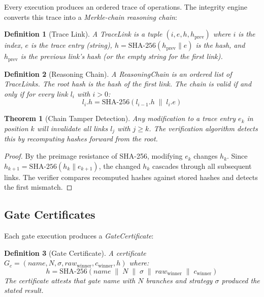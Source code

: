 \documentclass[11pt,a4paper]{article}
\newtheorem{definition}{Definition}[section]
\newtheorem{theorem}{Theorem}[section]
\begin{document}
Every execution produces an ordered trace of operations. The integrity engine
converts this trace into a \emph{Merkle-chain reasoning chain}:

\begin{definition}[Trace Link]
A \emph{TraceLink} is a tuple $(i, e, h, h_{\text{prev}})$ where $i$ is the
index, $e$ is the trace entry (string), $h = \mathrm{SHA\text{-}256}(h_{\text{prev}} \| e)$
is the hash, and $h_{\text{prev}}$ is the previous link's hash (or the empty
string for the first link).
\end{definition}

\begin{definition}[Reasoning Chain]
A \emph{ReasoningChain} is an ordered list of TraceLinks. The
\emph{root hash} is the hash of the first link. The chain is
\emph{valid} if and only if for every link $l_i$ with $i > 0$:
\[
  l_i.h = \mathrm{SHA\text{-}256}(l_{i-1}.h \;\|\; l_i.e)
\]
\end{definition}

\begin{theorem}[Chain Tamper Detection]
Any modification to a trace entry $e_k$ in position $k$ will invalidate
all links $l_j$ with $j \geq k$. The verification algorithm detects this
by recomputing hashes forward from the root.
\end{theorem}

\begin{proof}
By the preimage resistance of SHA-256, modifying $e_k$ changes $h_k$.
Since $h_{k+1} = \mathrm{SHA\text{-}256}(h_k \| e_{k+1})$, the changed $h_k$
cascades through all subsequent links. The verifier compares recomputed
hashes against stored hashes and detects the first mismatch.
\end{proof}

\subsection{Gate Certificates}

Each gate execution produces a \emph{GateCertificate}:

\begin{definition}[Gate Certificate]
A certificate $G_c = (\mathit{name}, N, \sigma, \mathit{raw}_{\text{winner}},
c_{\text{winner}}, h)$ where:
\[
  h = \mathrm{SHA\text{-}256}(\mathit{name} \;\|\; N \;\|\; \sigma \;\|\;
  \mathit{raw}_{\text{winner}} \;\|\; c_{\text{winner}})
\]
The certificate attests that gate \emph{name} with $N$ branches and strategy
$\sigma$ produced the stated result.
\end{definition}
\end{document}
